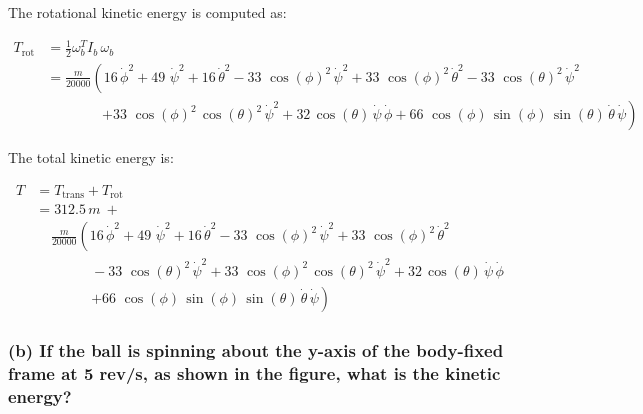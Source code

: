 \documentclass[12pt, letterpaper]{../assignment}
\begin{document}
The rotational kinetic energy is computed as:

\begin{equation*}
  \begin{aligned}
    T_\text{rot} &= \frac{1}{2} \omega_b^T I_b\, \omega_b \\
      &= \frac{m}{20000}\left(16\,\dot{\phi}^2+49\,\,\dot{\psi}^2+16\,\dot{\theta}^2-33\,\,{\cos\left(\phi \right)}^2\,\dot{\psi}^2+33\,\,{\cos\left(\phi \right)}^2\,\dot{\theta}^2-33\,\,{\cos\left(\theta \right)}^2\,\dot{\psi}^2\right. \\
      & \ \ \ \ \ \ \ \ \ \ \ \ \ \ \ \ \ \ \left.+33\,\,{\cos\left(\phi \right)}^2\,{\cos\left(\theta \right)}^2\,\dot{\psi}^2+32\,\cos\left(\theta \right)\,\dot{\psi} \,\dot{\phi} +66\,\,\cos\left(\phi \right)\,\sin\left(\phi \right)\,\sin\left(\theta \right)\,\dot{\theta} \,\dot{\psi}\right)
  \end{aligned}
\end{equation*}

The total kinetic energy is:

\begin{answer}
\begin{equation*}
  \begin{aligned}
    T &= T_\text{trans} + T_\text{rot} \\
      &= 312.5\,m \ +\\
      & \ \ \ \ \  \frac{m}{20000}\left(16\,\dot{\phi}^2+49\,\,\dot{\psi}^2+16\,\dot{\theta}^2-33\,\,{\cos\left(\phi \right)}^2\,\dot{\psi}^2+33\,\,{\cos\left(\phi \right)}^2\,\dot{\theta}^2\right. \\ 
      & \ \ \ \ \ \ \ \ \ \ \ \ \ \ \ \ \ \ -33\,\,{\cos\left(\theta \right)}^2\,\dot{\psi}^2 +33\,\,{\cos\left(\phi \right)}^2\,{\cos\left(\theta \right)}^2\,\dot{\psi}^2+32\,\cos\left(\theta \right)\,\dot{\psi} \,\dot{\phi} \\
      & \ \ \ \ \ \ \ \ \ \ \ \ \ \ \ \ \ \ \left. +66\,\,\cos\left(\phi \right)\,\sin\left(\phi \right)\,\sin\left(\theta \right)\,\dot{\theta} \,\dot{\psi}\right)
  \end{aligned}
\end{equation*}
\end{answer}

\subsubsection*{(b) If the ball is spinning about the y-axis of the body-fixed frame at 5 rev/s,
as shown in the figure,
what is the kinetic energy?}
\end{document}
